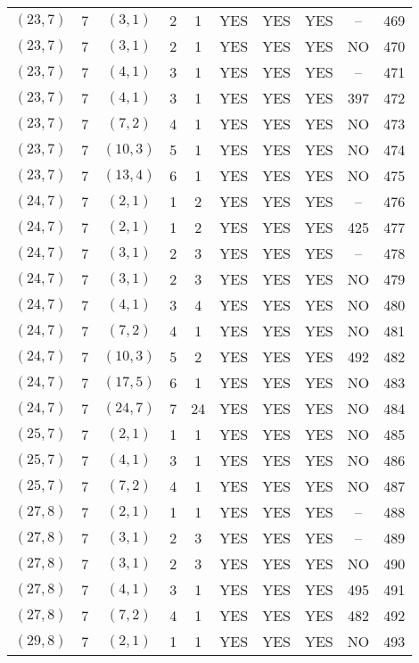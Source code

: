 \begin{longtable}{|c|c|c|c|c|c|c|c|c|c|}
$(23, 7)$ & 7 & $(3, 1)$ & 2 & 1 & YES & YES & YES & -- & 469\\
$(23, 7)$ & 7 & $(3, 1)$ & 2 & 1 & YES & YES & YES & NO & 470\\
$(23, 7)$ & 7 & $(4, 1)$ & 3 & 1 & YES & YES & YES & -- & 471\\
$(23, 7)$ & 7 & $(4, 1)$ & 3 & 1 & YES & YES & YES & 397 & 472\\
$(23, 7)$ & 7 & $(7, 2)$ & 4 & 1 & YES & YES & YES & NO & 473\\
$(23, 7)$ & 7 & $(10, 3)$ & 5 & 1 & YES & YES & YES & NO & 474\\
$(23, 7)$ & 7 & $(13, 4)$ & 6 & 1 & YES & YES & YES & NO & 475\\
$(24, 7)$ & 7 & $(2, 1)$ & 1 & 2 & YES & YES & YES & -- & 476\\
$(24, 7)$ & 7 & $(2, 1)$ & 1 & 2 & YES & YES & YES & 425 & 477\\
$(24, 7)$ & 7 & $(3, 1)$ & 2 & 3 & YES & YES & YES & -- & 478\\
$(24, 7)$ & 7 & $(3, 1)$ & 2 & 3 & YES & YES & YES & NO & 479\\
$(24, 7)$ & 7 & $(4, 1)$ & 3 & 4 & YES & YES & YES & NO & 480\\
$(24, 7)$ & 7 & $(7, 2)$ & 4 & 1 & YES & YES & YES & NO & 481\\
$(24, 7)$ & 7 & $(10, 3)$ & 5 & 2 & YES & YES & YES & 492 & 482\\
$(24, 7)$ & 7 & $(17, 5)$ & 6 & 1 & YES & YES & YES & NO & 483\\
$(24, 7)$ & 7 & $(24, 7)$ & 7 & 24 & YES & YES & YES & NO & 484\\
$(25, 7)$ & 7 & $(2, 1)$ & 1 & 1 & YES & YES & YES & NO & 485\\
$(25, 7)$ & 7 & $(4, 1)$ & 3 & 1 & YES & YES & YES & NO & 486\\
$(25, 7)$ & 7 & $(7, 2)$ & 4 & 1 & YES & YES & YES & NO & 487\\
$(27, 8)$ & 7 & $(2, 1)$ & 1 & 1 & YES & YES & YES & -- & 488\\
$(27, 8)$ & 7 & $(3, 1)$ & 2 & 3 & YES & YES & YES & -- & 489\\
$(27, 8)$ & 7 & $(3, 1)$ & 2 & 3 & YES & YES & YES & NO & 490\\
$(27, 8)$ & 7 & $(4, 1)$ & 3 & 1 & YES & YES & YES & 495 & 491\\
$(27, 8)$ & 7 & $(7, 2)$ & 4 & 1 & YES & YES & YES & 482 & 492\\
$(29, 8)$ & 7 & $(2, 1)$ & 1 & 1 & YES & YES & YES & NO & 493\\

\end{longtable}
